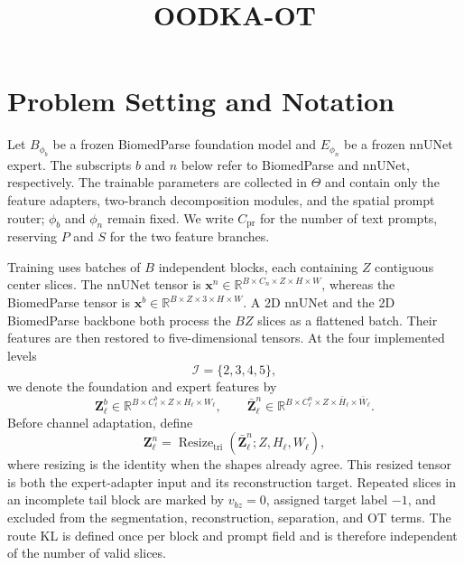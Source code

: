 \documentclass[10pt]{article}
\title{OODKA-OT}
\date{}
\newcommand{\R}{\mathbb{R}}
\begin{document}
\maketitle

\section{Problem Setting and Notation}


Let $B_{\phi_b}$ be a frozen BiomedParse foundation model and $E_{\phi_n}$
be a frozen nnUNet expert.  The subscripts $b$ and $n$ below refer to
BiomedParse and nnUNet, respectively.  The trainable parameters are collected in
$\Theta$ and contain only the feature adapters, two-branch decomposition modules,
and the spatial prompt router; $\phi_b$ and $\phi_n$ remain fixed.  We write
$C_{\mathrm{pr}}$ for the number of text prompts, reserving $P$ and $S$ for the
two feature branches.

Training uses batches of $B$ independent blocks, each containing $Z$ contiguous
center slices.  The nnUNet tensor is
$\bm{x}^{n}\in\R^{B\times C_n\times Z\times H\times W}$, whereas the
BiomedParse tensor is
$\bm{x}^{b}\in\R^{B\times Z\times 3\times H\times W}$.  A 2D nnUNet and the
2D BiomedParse backbone both process the $BZ$ slices as a flattened batch.  Their
features are then restored to five-dimensional tensors.  At the four implemented
levels
\begin{equation}
    \mathcal{I}=\{2,3,4,5\},
\end{equation}
we denote the foundation and expert features by
\begin{equation}
    \bm{Z}^{b}_{\ell}\in
    \R^{B\times C^b_\ell\times Z\times H_\ell\times W_\ell},
    \qquad
    \bar{\bm{Z}}^{n}_{\ell}\in
    \R^{B\times C^n_\ell\times Z\times \bar H_\ell\times \bar W_\ell}.
\end{equation}
Before channel adaptation, define
\begin{equation}
    \bm{Z}^{n}_{\ell}
    =\operatorname{Resize}_{\mathrm{tri}}
      (\bar{\bm{Z}}^{n}_{\ell};Z,H_\ell,W_\ell),
\end{equation}
where resizing is the identity when the shapes already agree.  This resized
tensor is both the expert-adapter input and its reconstruction target.  Repeated
slices in an incomplete tail block are marked by
$v_{bz}=0$, assigned target label $-1$, and excluded from the segmentation,
reconstruction, separation, and OT terms.  The route KL is defined once per
block and prompt field and is therefore independent of the number of valid
slices.
\end{document}
